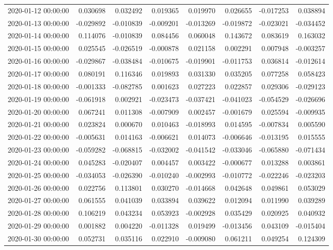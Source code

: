 \begin{tabular}{lrrrrrrr}
2020-01-12 00:00:00 & 0.030698 & 0.032492 & 0.019365 & 0.019970 & 0.026655 & -0.017253 & 0.038894 \\
2020-01-13 00:00:00 & -0.029892 & -0.010839 & -0.009201 & -0.013269 & -0.019872 & -0.023021 & -0.034452 \\
2020-01-14 00:00:00 & 0.114076 & -0.010839 & 0.084456 & 0.060048 & 0.143672 & 0.083619 & 0.163032 \\
2020-01-15 00:00:00 & 0.025545 & -0.026519 & -0.000878 & 0.021158 & 0.002291 & 0.007948 & -0.003257 \\
2020-01-16 00:00:00 & -0.029867 & -0.038484 & -0.010675 & -0.019901 & -0.011753 & 0.036814 & -0.012614 \\
2020-01-17 00:00:00 & 0.080191 & 0.116346 & 0.019893 & 0.031330 & 0.035205 & 0.077258 & 0.058423 \\
2020-01-18 00:00:00 & -0.001333 & -0.082785 & 0.001623 & 0.027223 & 0.022857 & 0.029306 & -0.029123 \\
2020-01-19 00:00:00 & -0.061918 & 0.002921 & -0.023473 & -0.037421 & -0.041023 & -0.054529 & -0.026696 \\
2020-01-20 00:00:00 & 0.067241 & 0.011308 & -0.007909 & 0.002457 & -0.001679 & 0.025594 & -0.009935 \\
2020-01-21 00:00:00 & 0.023824 & 0.000670 & 0.010463 & -0.018993 & 0.014595 & -0.007834 & 0.005590 \\
2020-01-22 00:00:00 & -0.005631 & 0.014163 & -0.006621 & 0.014073 & -0.006646 & -0.013195 & 0.015555 \\
2020-01-23 00:00:00 & -0.059282 & -0.068815 & -0.032002 & -0.041542 & -0.033046 & -0.065880 & -0.071434 \\
2020-01-24 00:00:00 & 0.045283 & -0.020407 & 0.004457 & 0.003422 & -0.000677 & 0.013288 & 0.003861 \\
2020-01-25 00:00:00 & -0.034053 & -0.026390 & -0.010240 & -0.002993 & -0.010772 & -0.022246 & -0.023203 \\
2020-01-26 00:00:00 & 0.022756 & 0.113801 & 0.030270 & -0.014668 & 0.042648 & 0.049861 & 0.053029 \\
2020-01-27 00:00:00 & 0.061555 & 0.041039 & 0.033894 & 0.039622 & 0.012094 & 0.011990 & 0.039289 \\
2020-01-28 00:00:00 & 0.106219 & 0.043234 & 0.053923 & -0.002928 & 0.035429 & 0.020925 & 0.040932 \\
2020-01-29 00:00:00 & 0.001882 & 0.004220 & -0.011328 & 0.019499 & -0.013456 & 0.043109 & -0.015404 \\
2020-01-30 00:00:00 & 0.052731 & 0.035116 & 0.022910 & -0.009080 & 0.061211 & 0.049254 & 0.124309 \\

\end{tabular}
